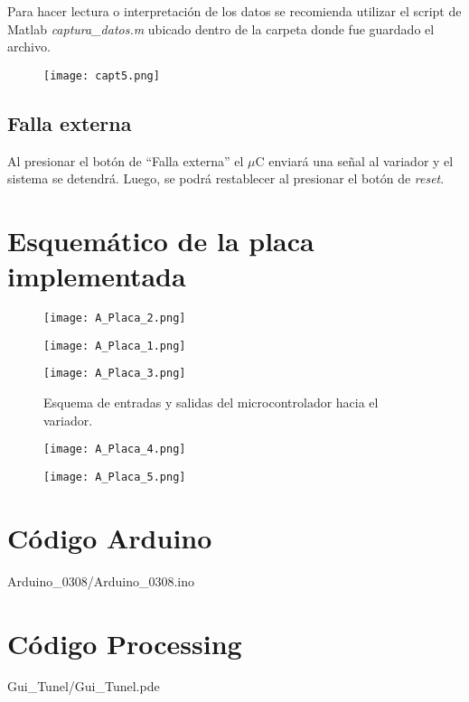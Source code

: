 Para hacer lectura o interpretación de los datos se recomienda utilizar el script de Matlab \textit{captura\_datos.m} ubicado dentro de la carpeta donde fue guardado el archivo.

\begin{figure}[H]
	\centering
	\texttt{[image: capt5.png]}
	\label{fig:capt5}
\end{figure}

\subsection{Falla externa}
	Al presionar el botón de “Falla externa” el $\mu$C enviará una señal al variador y el sistema se detendrá. Luego, se podrá restablecer al presionar el botón de \textit{reset}.

\newpage
\section{Esquemático de la placa implementada}
\begin{figure}[H]
	\centering
	\texttt{[image: A\_Placa\_2.png]}
\end{figure}
\begin{figure}[H]
	\centering	\texttt{[image: A\_Placa\_1.png]}
\end{figure}
\begin{figure}[H]
	\centering
	\texttt{[image: A\_Placa\_3.png]}
	
	\caption{Esquema de entradas y salidas del microcontrolador hacia el variador.} 
\end{figure}
\begin{figure}[H]
	\centering	\texttt{[image: A\_Placa\_4.png]}
\end{figure}	
\begin{figure}[H]
	\centering	\texttt{[image: A\_Placa\_5.png]}
\end{figure}


\newpage
\section{Código Arduino}
 {Arduino_0308/Arduino_0308.ino}


\newpage
\section{Código Processing}
 {Gui_Tunel/Gui_Tunel.pde}



